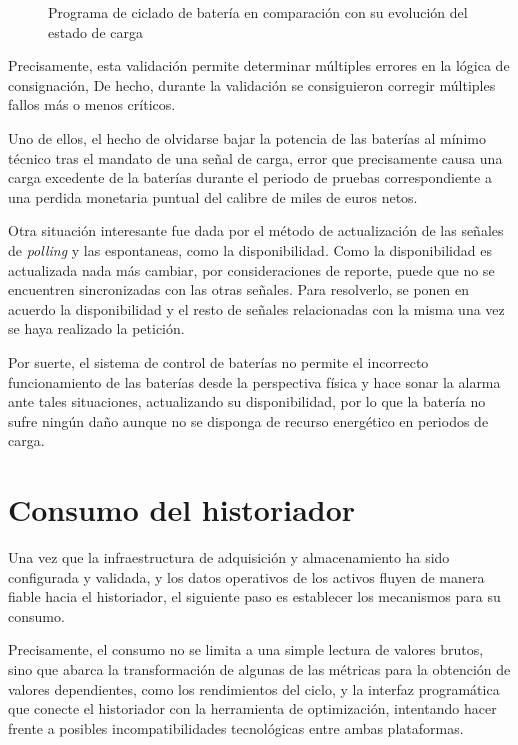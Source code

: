 \begin{figure}
  \centering
  \caption{Programa de ciclado de batería en comparación con su evolución del estado de carga}
  \label{fig:programa-bateria}
\end{figure}

Precisamente, esta validación permite determinar múltiples errores en la lógica de consignación, De hecho, durante la validación se consiguieron corregir múltiples fallos más o menos críticos.

Uno de ellos, el hecho de olvidarse bajar la potencia de las baterías al mínimo técnico tras el mandato de una señal de carga, error que precisamente causa una carga excedente de la baterías durante el periodo de pruebas correspondiente a una perdida monetaria puntual del calibre de miles de euros netos.

Otra situación interesante fue dada por el método de actualización de las señales de \textit{polling} y las espontaneas, como la disponibilidad. Como la disponibilidad es actualizada nada más cambiar, por consideraciones de reporte, puede que no se encuentren sincronizadas con las otras señales. Para resolverlo, se ponen en acuerdo la disponibilidad y el resto de señales relacionadas con la misma una vez se haya realizado la petición.

Por suerte, el sistema de control de baterías no permite el incorrecto funcionamiento de las baterías desde la perspectiva física y hace sonar la alarma ante tales situaciones, actualizando su disponibilidad, por lo que la batería no sufre ningún daño aunque no se disponga de recurso energético en periodos de carga.

\section{Consumo del historiador}
\label{makereference3.5}

Una vez que la infraestructura de adquisición y almacenamiento ha sido configurada y validada, y los datos operativos de los activos fluyen de manera fiable hacia el historiador, el siguiente paso es establecer los mecanismos para su consumo.

Precisamente, el consumo no se limita a una simple lectura de valores brutos, sino que abarca la transformación de algunas de las métricas para la obtención de valores dependientes, como los rendimientos del ciclo, y la interfaz programática que conecte el historiador con la herramienta de optimización, intentando hacer frente a posibles incompatibilidades tecnológicas entre ambas plataformas.

